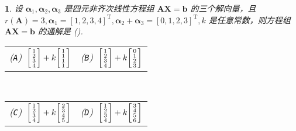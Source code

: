 \documentclass[openany,twocolumn]{ctexbook}
\makeatletter
\numberwithin{figure}{section}
\theoremstyle{change}
\theoremstyle{change}
\newtheorem{titwo}{}
\def\kuo{ \mbox{(\hspace{1pc})}}
\newcommand{\twoch}[4]{\noindent\begin{tabular}{*{2}{@{}p{3.94cm}}}(\texttt{A})~#1 & (\texttt{B})~#2\end{tabular}\\\begin{tabular}{*{2}{@{}p{3.94cm}}}(\texttt{C})~#3 & (\texttt{D})~#4\end{tabular}}  %
\def\TT{\mathrm{T}}
\makeatother
\begin{document}
	\begin{titwo}
		设 $\bm \alpha_{1},\bm \alpha_{2},\bm \alpha_{3}$ 是四元非齐次线性方程组 $\bm A \bm X = \bm b$ 的三个解向量，且 $r(\bm A) = 3,\bm \alpha_{1}  = [1,2,3,4]^{\TT},\bm \alpha_{2} + \bm \alpha_{3} = [0,1,2,3]^{\TT},k$ 是任意常数，则方程组 $\bm A \bm X = \bm b$ 的通解是\kuo.

		\twoch%
		{$\begin{bsmallmatrix}
			1 \\
			2 \\
			3 \\
			4
		\end{bsmallmatrix} + k \begin{bsmallmatrix}
			1 \\
			1 \\
			1 \\
			1
		\end{bsmallmatrix}$}
		{$\begin{bsmallmatrix}
			1 \\
			2 \\
			3 \\
			4
		\end{bsmallmatrix} + k \begin{bsmallmatrix}
			0 \\
			1 \\
			2 \\
			3
		\end{bsmallmatrix}$}%
		{$\begin{bsmallmatrix}
			1 \\
			2 \\
			3 \\
			4
		\end{bsmallmatrix} + k \begin{bsmallmatrix}
			2 \\
			3 \\
			4 \\
			5
		\end{bsmallmatrix}$}%
		{$\begin{bsmallmatrix}
			1 \\
			2 \\
			3 \\
			4
		\end{bsmallmatrix} + k \begin{bsmallmatrix}
			3 \\
			4 \\
			5 \\
			6
		\end{bsmallmatrix}$}
	\end{titwo}
\end{document}
